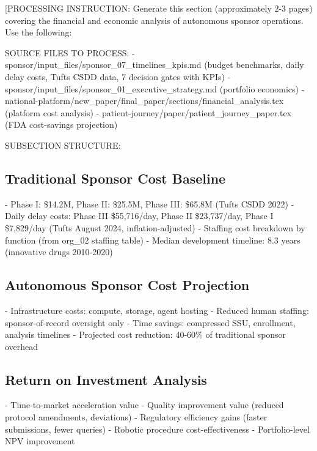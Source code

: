 
[PROCESSING INSTRUCTION: Generate this section (approximately 2-3 pages) covering the
financial and economic analysis of autonomous sponsor operations. Use the following:

SOURCE FILES TO PROCESS:
- sponsor/input\_files/sponsor\_07\_timelines\_kpis.md (budget benchmarks, daily delay costs,
  Tufts CSDD data, 7 decision gates with KPIs)
- sponsor/input\_files/sponsor\_01\_executive\_strategy.md (portfolio economics)
- national-platform/new\_paper/final\_paper/sections/financial\_analysis.tex (platform cost analysis)
- patient-journey/paper/patient\_journey\_paper.tex (FDA cost-savings projection)

SUBSECTION STRUCTURE:

\subsection{Traditional Sponsor Cost Baseline}
- Phase I: \$14.2M, Phase II: \$25.5M, Phase III: \$65.8M (Tufts CSDD 2022)
- Daily delay costs: Phase III \$55,716/day, Phase II \$23,737/day, Phase I \$7,829/day
  (Tufts August 2024, inflation-adjusted)
- Staffing cost breakdown by function (from org\_02 staffing table)
- Median development timeline: 8.3 years (innovative drugs 2010-2020)

\subsection{Autonomous Sponsor Cost Projection}
- Infrastructure costs: compute, storage, agent hosting
- Reduced human staffing: sponsor-of-record oversight only
- Time savings: compressed SSU, enrollment, analysis timelines
- Projected cost reduction: 40-60\% of traditional sponsor overhead

\subsection{Return on Investment Analysis}
- Time-to-market acceleration value
- Quality improvement value (reduced protocol amendments, deviations)
- Regulatory efficiency gains (faster submissions, fewer queries)
- Robotic procedure cost-effectiveness
- Portfolio-level NPV improvement

